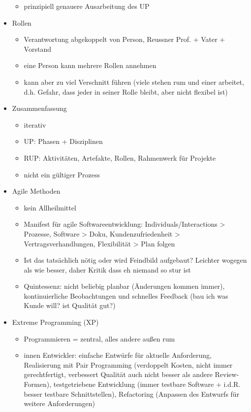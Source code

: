 \documentclass[paper=a4, fontsize=11pt]{scrartcl} %
\numberwithin{equation}{section} %
\numberwithin{figure}{section} %
\numberwithin{table}{section} %
\begin{document}
\begin{itemize}
\begin{itemize}
    \item prinzipiell genauere Ausarbeitung des UP
  \end{itemize}
  \item Rollen
  \begin{itemize}
    \item Verantwortung abgekoppelt von Person, Reussner Prof. + Vater + Vorstand
    \item eine Person kann mehrere Rollen annehmen
    \item kann aber zu viel Verschnitt führen (viele stehen rum und einer arbeitet, d.h. Gefahr, dass jeder in seiner Rolle bleibt, aber nicht flexibel ist)
  \end{itemize}
  \item Zusammenfassung
  \begin{itemize}
    \item iterativ
    \item UP: Phasen + Disziplinen
    \item RUP: Aktivitäten, Artefakte, Rollen, Rahmenwerk für Projekte
    \item nicht ein gültiger Prozess
  \end{itemize}
  \item Agile Methoden
  \begin{itemize}
    \item kein Allheilmittel
    \item Manifest für agile Softwareentwicklung: Individuals/Interactions > Prozesse, Software > Doku, Kundenzufriedenheit > Vertragsverhandlungen, Flexibilität > Plan folgen
    \item Ist das tatsächlich nötig oder wird Feindbild aufgebaut? Leichter wogegen als wie besser, daher Kritik dass eh niemand so stur ist
    \item Quintessenz: nicht beliebig planbar (Änderungen kommen immer), kontinuierliche Beobachtungen und schnelles Feedback (bau ich was Kunde will? ist Qualität gut?)
  \end{itemize}
  \item Extreme Programming (XP)
  \begin{itemize}
    \item Programmieren = zentral, alles andere außen rum
    \item innen Entwickler: einfache Entwürfe für aktuelle Anforderung, Realisierung mit Pair Programming (verdoppelt Kosten, nicht immer gerechtfertigt, verbessert Qualität auch nicht besser als andere Review-Formen), testgetriebene Entwicklung (immer testbare Software + i.d.R. besser testbare Schnittstellen), Refactoring (Anpassen des Entwurfs für weitere Anforderungen)

\end{itemize}
\end{itemize}
\end{document}
